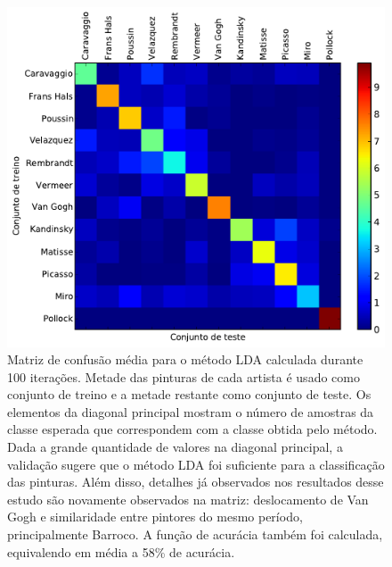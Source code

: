 \begin{figure}[h!]
\begin{center}
      \caption{Matriz de confusão média para o método LDA calculada
        durante 100 iterações. Metade das pinturas de cada artista é
        usado como conjunto de treino e a metade restante como
        conjunto de teste. Os elementos da diagonal principal mostram
        o número de amostras da classe esperada que correspondem com a
        classe obtida pelo método. Dada a grande quantidade de valores
        na diagonal principal, a validação sugere que o método LDA foi
        suficiente para a classificação das pinturas. Além disso,
        detalhes já observados nos resultados desse estudo são
        novamente observados na matriz: deslocamento de Van Gogh e
        similaridade entre pintores do mesmo período, principalmente
        Barroco. A função de acurácia também foi calculada,
        equivalendo em média a 58\% de acurácia.}
        \label{fig:cm}
        \includegraphics[width=\columnwidth]{figs/matriz_confusao}
        \fonteminha
\end{center}
\end{figure}



